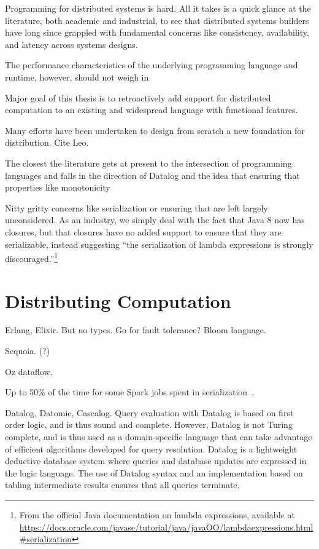 Programming for distributed systems is hard. All it takes is a quick glance at
the literature, both academic and industrial, to see that distributed systems
builders have long since grappled with fundamental concerns like consistency,
availability, and latency across systems designs.

The performance characteristics of the underlying programming language and
runtime, however, should not weigh in

Major goal of this thesis is to retroactively add support for distributed
computation to an existing and widespread language with functional features.

Many efforts have been undertaken to design from scratch a new foundation for
distribution. Cite Leo.


The closest the literature gets at present to the intersection of programming
languages and falls in the direction of Datalog and the idea that ensuring that
properties like monotonicity

Nitty gritty concerns like serialization or ensuring that are left largely
unconsidered. As an industry, we simply deal with the fact that Java 8 now has
closures, but that closures have no added support to ensure that they are
serializable, instead suggesting ``the serialization of lambda expressions is
strongly discouraged.''\footnote{From the official Java documentation on lambda
expressions, available at
\url{https://docs.oracle.com/javase/tutorial/java/javaOO/lambdaexpressions.html\#serialization}}

\section{Distributing Computation}



Erlang, Elixir. But no types. Go for fault tolerance? Bloom language.

Sequoia. (?)

Oz dataflow.

Up to 50\% of the time for some Spark jobs spent in
serialization~\cite{OusterhoutSerialization}.

Datalog, Datomic, Cascalog. Query evaluation with Datalog is based on first
order logic, and is thus sound and complete. However, Datalog is not Turing
complete, and is thus used as a domain-specific language that can take advantage
of efficient algorithms developed for query resolution. Datalog is a lightweight
deductive database system where queries and database updates are expressed in
the logic language. The use of Datalog syntax and an implementation based on
tabling intermediate results ensures that all queries terminate.

